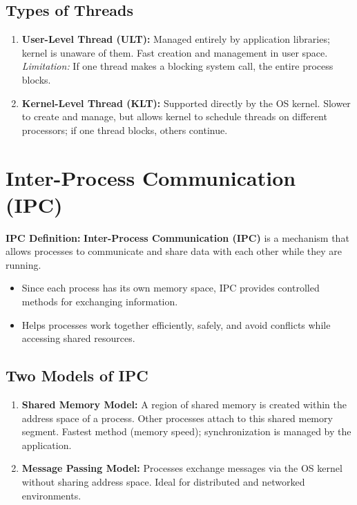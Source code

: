 \documentclass[10pt,a4paper]{article}
\begin{document}
\subsection{Types of Threads}
\begin{enumerate}
    \item \textbf{User-Level Thread (ULT):} Managed entirely by application libraries; kernel is unaware of them. Fast creation and management in user space. \textit{Limitation:} If one thread makes a blocking system call, the entire process blocks.
    \item \textbf{Kernel-Level Thread (KLT):} Supported directly by the OS kernel. Slower to create and manage, but allows kernel to schedule threads on different processors; if one thread blocks, others continue.
\end{enumerate}

\clearpage
\section{Inter-Process Communication (IPC)}

\begin{defbox}
    \textbf{\textcolor{accentBlue}{IPC Definition:}} \textbf{Inter-Process Communication (IPC)} is a mechanism that allows processes to communicate and share data with each other while they are running.
\end{defbox}

\begin{itemize}
    \item Since each process has its own memory space, IPC provides controlled methods for exchanging information.
    \item Helps processes work together efficiently, safely, and avoid conflicts while accessing shared resources.
\end{itemize}

\subsection{Two Models of IPC}
\begin{enumerate}
    \item \textbf{Shared Memory Model:} A region of shared memory is created within the address space of a process. Other processes attach to this shared memory segment. Fastest method (memory speed); synchronization is managed by the application.
    \item \textbf{Message Passing Model:} Processes exchange messages via the OS kernel without sharing address space. Ideal for distributed and networked environments.
\end{enumerate}
\end{document}

